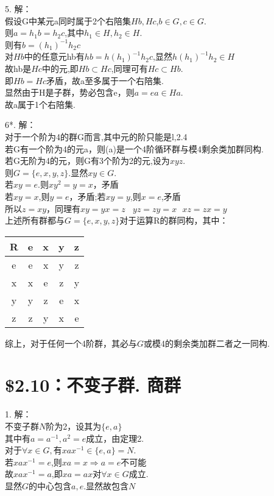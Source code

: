 \documentclass{ctexart}
\begin{document}
5.
解：\\
假设G中某元a同时属于2个右陪集$Hb,Hc$,$b \in G,c \in G$.\\
则$a=h_1b=h_2c$,其中$h_1 \in H, h_2 \in H$.\\
则有$b=(h_1)^{-1}h_2c$\\
对$Hb$中的任意元hb有$hb=h(h_1)^{-1}h_2c$,显然$h(h_1)^{-1}h_2 \in H$\\
故hb是$Hc$中的元,即$Hb \subset Hc$,同理可有$Hc \subset Hb$.\\
即$Hb=Hc$矛盾，故a至多属于一个右陪集. \\
显然由于H是子群，势必包含e，则$a=ea \in Ha$.\\
故a属于1个右陪集.

6*.
解：\\
对于一个阶为4的群G而言,其中元的阶只能是l,2.4\\
若G有一个阶为4的元a，则(a)是一个4阶循环群与模4剩余类加群同构.\\
若G无阶为4的元，则G有3个阶为2的元,设为$xyz$.\\
则$G=\{e,x,y,z\}$.显然$xy \in G$.\\
若$xy=e$.则$xy^2=y=x$，矛盾\\
若$xy=x$,则$y=e$，矛盾;若$xy=y$,则$x=e$,矛盾\\
所以$z=xy$，同理有$xy=yx=z \ \ \ \ yz=zy=x \ \ \ xz=zx=y$\\
上述所有群都与$G=\{e,x,y,z\}$对于运算R的群同构，其中：
\begin{center}
	\begin{tabular}{c|cccc}
		R & e & x & y & z\\
		\hline
		e & e & x & y & z\\
		x & x & e & z & y\\
		y & y & z & e & x\\
		z & z & y & x & e\\		
	\end{tabular} 
\end{center}
综上，对于任何一个4阶群，其必与$G$或模4的剩余类加群二者之一同构.
\section*{\$2.10：不变子群. 商群}
1.
解：\\
不变子群$N$阶为2，设其为$\{e,a\}$\\
其中有$a=a^{-1},a^2=e$成立，由定理2.\\
对于$\forall x \in G,$有$xax^{-1} \in \{e,a\}=N$.\\
若$xax^{-1}=e$,则$xa=x \Rightarrow a=e$不可能\\
故$xax^{-1}=a$,即$xa=ax$对$\forall x \in G$成立.\\
显然$G$的中心包含$a,e$.显然故包含$N$
\end{document}

